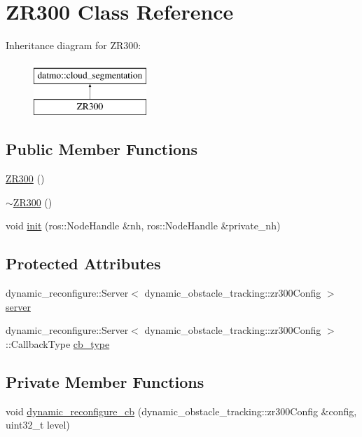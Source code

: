 \hypertarget{classZR300}{}\section{Z\+R300 Class Reference}
\label{classZR300}
Inheritance diagram for Z\+R300\+:\begin{figure}[H]
\begin{center}
\leavevmode
\includegraphics[height=2.000000cm]{classZR300}
\end{center}
\end{figure}
\subsection*{Public Member Functions}
\begin{DoxyCompactItemize}
\item 
\hyperlink{classZR300_a63a89a9de2af2d6d30ecf039b64c48a3}{Z\+R300} ()
\item 
\hyperlink{classZR300_af9ecd118c1a33dd2da78693de057c8b5}{$\sim$\+Z\+R300} ()
\item 
void \hyperlink{classZR300_aaecbf7e995d17a699c3305bc60dc547d}{init} (ros\+::\+Node\+Handle \&nh, ros\+::\+Node\+Handle \&private\+\_\+nh)
\end{DoxyCompactItemize}
\subsection*{Protected Attributes}
\begin{DoxyCompactItemize}
\item 
dynamic\+\_\+reconfigure\+::\+Server$<$ dynamic\+\_\+obstacle\+\_\+tracking\+::zr300\+Config $>$ \hyperlink{classZR300_afe2acfe42f2153ef3a488367ffdfcca0}{server}
\item 
dynamic\+\_\+reconfigure\+::\+Server$<$ dynamic\+\_\+obstacle\+\_\+tracking\+::zr300\+Config $>$\+::Callback\+Type \hyperlink{classZR300_ad68d353c780b751ba511b67f9b475b01}{cb\+\_\+type}
\end{DoxyCompactItemize}
\subsection*{Private Member Functions}
\begin{DoxyCompactItemize}
\item 
void \hyperlink{classZR300_a562f13a7e98d8b7b58818194d5aa142e}{dynamic\+\_\+reconfigure\+\_\+cb} (dynamic\+\_\+obstacle\+\_\+tracking\+::zr300\+Config \&config, uint32\+\_\+t level)
\end{DoxyCompactItemize}


